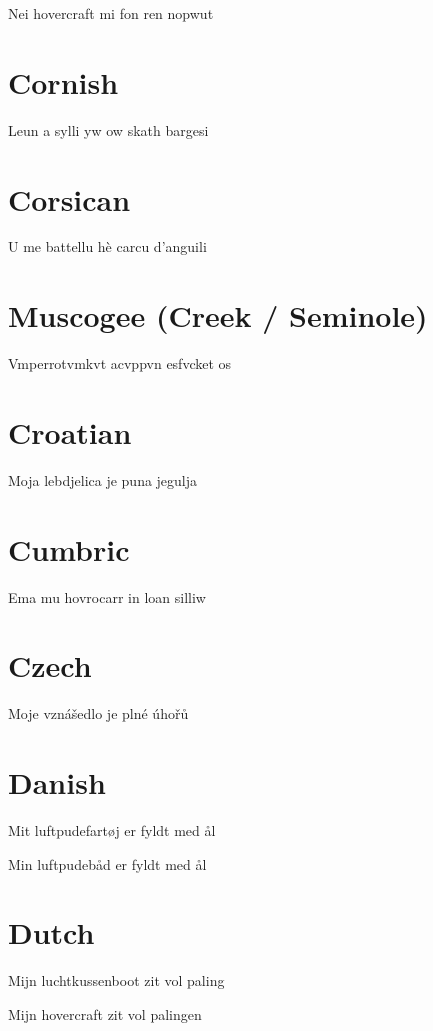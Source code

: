 \documentclass{article}
\begin{document}
Nei hovercraft mi fon ren nopwut

\section{Cornish}

Leun a sylli yw ow skath bargesi

\section{Corsican}

U me battellu hè carcu d'anguili

\section{Muscogee (Creek / Seminole)}

Vmperrotvmkvt acvppvn esfvcket os

\section{Croatian}

Moja lebdjelica je puna jegulja

\section{Cumbric}

Ema mu hovrocarr in loan silliw

\section{Czech}

Moje vznášedlo je plné úhořů

\section{Danish}

Mit luftpudefartøj er fyldt med ål

\noindent
Min luftpudebåd er fyldt med ål

\section{Dutch}

Mijn luchtkussenboot zit vol paling

\noindent
Mijn hovercraft zit vol palingen
\end{document}
